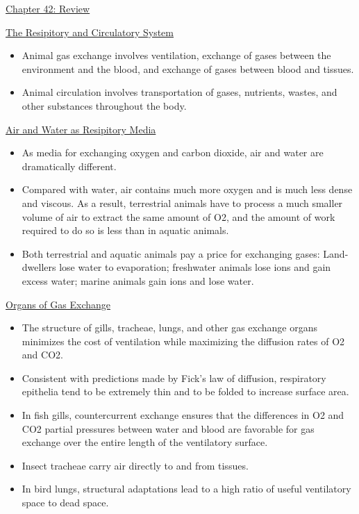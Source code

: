 \documentclass[12pt,letterpaper]{article}
\begin{document}
\hypertarget{42.r}{}
\begin{probbox}{\hyperlink{42}{Chapter 42: Review}}{
    \hyperlink{42.1}{The Resipitory and Circulatory System}
    \begin{itemize}
        \item Animal gas exchange involves ventilation, exchange of gases between the environment and the blood, and exchange of gases between blood and tissues. 
        \item Animal circulation involves transportation of gases, nutrients, wastes, and other substances throughout the body.
    \end{itemize}
    \hyperlink{42.2}{Air and Water as Resipitory Media}
    \begin{itemize}
        \item As media for exchanging oxygen and carbon dioxide, air and water are dramatically different. 
        \item Compared with water, air contains much more oxygen and is much less dense and viscous. As a result, terrestrial animals have to process a much smaller volume of air to extract the same amount of O2, and the amount of work required to do so is less than in aquatic animals. 
        \item Both terrestrial and aquatic animals pay a price for exchanging gases: Land-dwellers lose water to evaporation; freshwater animals lose ions and gain excess water; marine animals gain ions and lose water.      
    \end{itemize}
    \hyperlink{42.3}{Organs of Gas Exchange}
    \begin{itemize}
        \item The structure of gills, tracheae, lungs, and other gas exchange organs minimizes the cost of ventilation while maximizing the diffusion rates of O2 and CO2. 
        \item Consistent with predictions made by Fick’s law of diffusion, respiratory epithelia tend to be extremely thin and to be folded to increase surface area. 
        \item In fish gills, countercurrent exchange ensures that the differences in O2 and CO2 partial pressures between water and blood are favorable for gas exchange over the entire length of the ventilatory surface. 
        \item Insect tracheae carry air directly to and from tissues. 
        \item In bird lungs, structural adaptations lead to a high ratio of useful ventilatory space to dead space. 

\end{itemize}}
\end{probbox}
\end{document}
